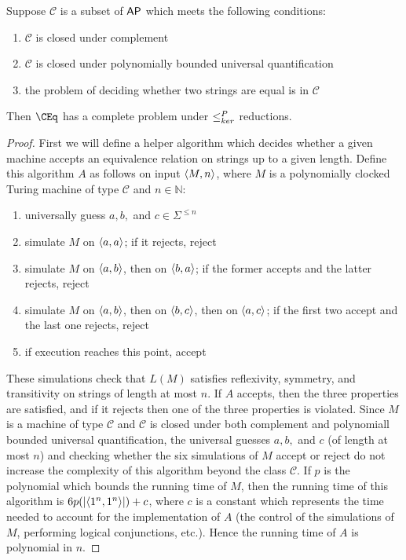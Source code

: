 \begin{theorem}\label{thm:generalcompleteness}
  Suppose $\mathcal{C}$ is a subset of ${\mathsf{AP}}$ which meets the following conditions:
  \begin{enumerate}
  \item $\mathcal{C}$ is closed under complement
  \item $\mathcal{C}$ is closed under polynomially bounded universal quantification
  \item the problem of deciding whether two strings are equal is in $\mathcal{C}$
  \end{enumerate}
  Then $\CEq$ has a complete problem under $\leq^{P}_{ker}$ reductions.
\end{theorem}
\begin{proof}
  First we will define a helper algorithm which decides whether a given machine accepts an equivalence relation on strings up to a given length.
  Define this algorithm $A$ as follows on input $\langle M,n\rangle$, where $M$ is a polynomially clocked Turing machine of type $\mathcal{C}$ and $n\in\mathbb{N}$:
  \begin{enumerate}
  \item universally guess $a,b,$ and $c\in\Sigma^{\leq n}$
  \item simulate $M$ on $\langle a,a\rangle$; if it rejects, reject
  \item simulate $M$ on $\langle a,b\rangle$, then on $\langle b,a\rangle$; if the former accepts and the latter rejects, reject
  \item simulate $M$ on $\langle a,b\rangle$, then on $\langle b,c\rangle$, then on $\langle a,c\rangle$; if the first two accept and the last one rejects, reject
  \item if execution reaches this point, accept
  \end{enumerate}
  These simulations check that $L(M)$ satisfies reflexivity, symmetry, and transitivity on strings of length at most $n$.
  If $A$ accepts, then the three properties are satisfied, and if it rejects then one of the three properties is violated.
  Since $M$ is a machine of type $\mathcal{C}$ and $\mathcal{C}$ is closed under both complement and polynomiall bounded universal quantification, the universal guesses $a,b,$ and $c$ (of length at most $n$) and checking whether the six simulations of $M$ accept or reject do not increase the complexity of this algorithm beyond the class $\mathcal{C}$.
  If $p$ is the polynomial which bounds the running time of $M$, then the running time of this algorithm is $6p(|\langle1^n,1^n\rangle|)+c$, where $c$ is a constant which represents the time needed to account for the implementation of $A$ (the control of the simulations of $M$, performing logical conjunctions, etc.).
  Hence the running time of $A$ is polynomial in $n$.


\end{proof}
